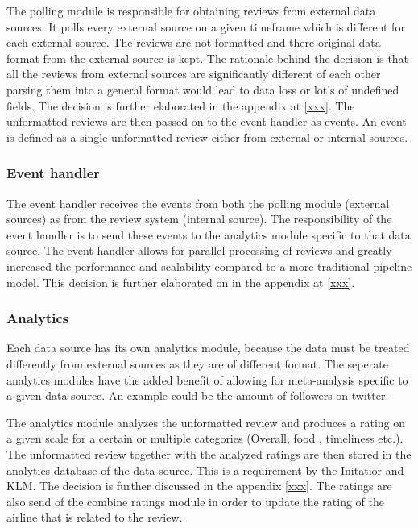 The polling module is responsible for obtaining reviews from external data sources. It polls every external source on a given timeframe which is different for each external source. The reviews are not formatted and there original data format from the external source is kept. The rationale behind the decision is that all the reviews from external sources are significantly different of each other parsing them into a general format would lead to data loss or lot's of undefined fields. The decision is further elaborated in the appendix at \ref{xxx}. The unformatted reviews are then passed on to the event handler as events. An event is defined as a single unformatted review either from external or internal sources. 

\subsubsection{Event handler}

The event handler receives the events from both the polling module (external sources) as from the review system (internal source). The responsibility of the event handler is to send these events to the analytics module specific to that data source. The event handler allows for parallel processing of reviews and greatly increased the performance and scalability compared to a more traditional pipeline model. This decision is further elaborated on in the appendix at \ref{xxx}. 

\subsubsection{Analytics}

Each data source has its own analytics module, because the data must be treated differently from external sources as they are of different format. The seperate analytics modules have the added benefit of allowing for meta-analysis specific to a given data source. An example could be the amount of followers on twitter.

The analytics module analyzes the unformatted review and produces a rating on a given scale for a certain or multiple categories (Overall, food , timeliness etc.). The unformatted review together with the analyzed ratings are then stored in the analytics database of the data source. This is a requirement by the Initatior and KLM. The decision is further discussed in the appendix \ref{xxx}. The ratings are also send of the combine ratings module in order to update the rating of the airline that is related to the review.

